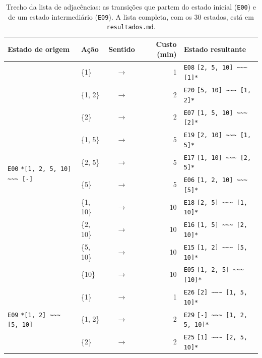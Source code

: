 \documentclass[12pt,a4paper]{article}
\begin{document}
\begin{table}[H]
  \centering
  \caption{Trecho da lista de adjacências: as transições que partem do estado inicial (\texttt{E00}) e de um estado intermediário (\texttt{E09}). A lista completa, com os 30 estados, está em \texttt{resultados.md}.}
  \label{tab:adjacencia}
  \small
  \begin{tabular}{llcrl}
    \toprule
    Estado de origem & Ação & Sentido & Custo (min) & Estado resultante \\
    \midrule
    \multirow{10}{*}{\texttt{E00} \texttt{*[1, 2, 5, 10] \textasciitilde\textasciitilde\textasciitilde{} [-]}}
      & \{1\}     & $\rightarrow$ &  1 & \texttt{E08} \texttt{[2, 5, 10] \textasciitilde\textasciitilde\textasciitilde{} [1]*} \\
      & \{1, 2\}  & $\rightarrow$ &  2 & \texttt{E20} \texttt{[5, 10] \textasciitilde\textasciitilde\textasciitilde{} [1, 2]*} \\
      & \{2\}     & $\rightarrow$ &  2 & \texttt{E07} \texttt{[1, 5, 10] \textasciitilde\textasciitilde\textasciitilde{} [2]*} \\
      & \{1, 5\}  & $\rightarrow$ &  5 & \texttt{E19} \texttt{[2, 10] \textasciitilde\textasciitilde\textasciitilde{} [1, 5]*} \\
      & \{2, 5\}  & $\rightarrow$ &  5 & \texttt{E17} \texttt{[1, 10] \textasciitilde\textasciitilde\textasciitilde{} [2, 5]*} \\
      & \{5\}     & $\rightarrow$ &  5 & \texttt{E06} \texttt{[1, 2, 10] \textasciitilde\textasciitilde\textasciitilde{} [5]*} \\
      & \{1, 10\} & $\rightarrow$ & 10 & \texttt{E18} \texttt{[2, 5] \textasciitilde\textasciitilde\textasciitilde{} [1, 10]*} \\
      & \{2, 10\} & $\rightarrow$ & 10 & \texttt{E16} \texttt{[1, 5] \textasciitilde\textasciitilde\textasciitilde{} [2, 10]*} \\
      & \{5, 10\} & $\rightarrow$ & 10 & \texttt{E15} \texttt{[1, 2] \textasciitilde\textasciitilde\textasciitilde{} [5, 10]*} \\
      & \{10\}    & $\rightarrow$ & 10 & \texttt{E05} \texttt{[1, 2, 5] \textasciitilde\textasciitilde\textasciitilde{} [10]*} \\
    \midrule
    \multirow{3}{*}{\texttt{E09} \texttt{*[1, 2] \textasciitilde\textasciitilde\textasciitilde{} [5, 10]}}
      & \{1\}     & $\rightarrow$ &  1 & \texttt{E26} \texttt{[2] \textasciitilde\textasciitilde\textasciitilde{} [1, 5, 10]*} \\
      & \{1, 2\}  & $\rightarrow$ &  2 & \texttt{E29} \texttt{[-] \textasciitilde\textasciitilde\textasciitilde{} [1, 2, 5, 10]*} \\
      & \{2\}     & $\rightarrow$ &  2 & \texttt{E25} \texttt{[1] \textasciitilde\textasciitilde\textasciitilde{} [2, 5, 10]*} \\
    \bottomrule
  \end{tabular}
\end{table}
\end{document}
